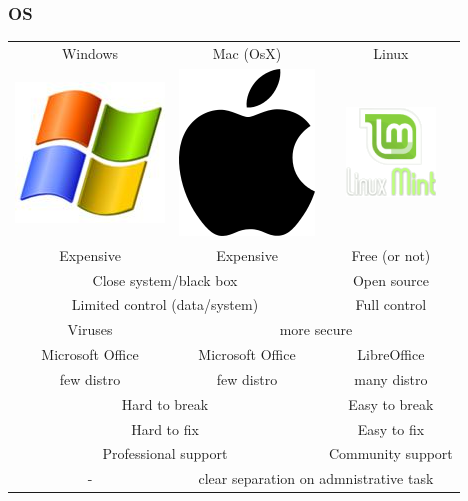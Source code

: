 \documentclass{beamer}
\begin{document}
\begin{frame}
\frametitle{OS}
\begin{tabular}{|ccc|}
\hline
Windows & Mac (OsX) & Linux\\
\includegraphics[scale=0.2]{windows.jpg} & \includegraphics[scale=0.2]{apple.png} & \includegraphics[scale=0.2]{mint.png}\\

\hline
Expensive & Expensive & Free (or not)\\
\multicolumn{2}{|c}{Close system/black box} & Open source\\
\multicolumn{2}{|c}{Limited control (data/system)} & Full control \\
Viruses &  \multicolumn{2}{c}{more secure}\\
Microsoft Office & Microsoft Office & LibreOffice \\
few distro & few distro & many distro\\
\multicolumn{2}{|c}{Hard to break} & Easy to break\\
\multicolumn{2}{|c}{Hard to fix} & Easy to fix\\
\multicolumn{2}{|c}{Professional support} & Community support \\
- & \multicolumn{2}{c|}{clear separation on admnistrative task}\\
\hline

\end{tabular}
\end{frame}
\end{document}
